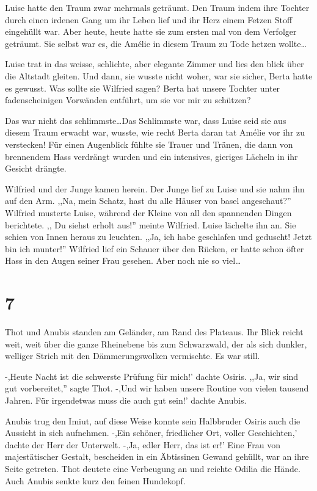 \documentclass[11pt,titlepage,a5paper]{book}
\newcommand{\am}{Amélie }
\begin{document}
Luise hatte den Traum zwar mehrmals geträumt. Den Traum indem ihre Tochter durch einen irdenen Gang um ihr Leben lief und ihr Herz einem Fetzen Stoff eingehüllt war. Aber heute, heute hatte sie zum ersten mal von dem Verfolger geträumt. Sie selbst war es, die \am in diesem Traum zu Tode hetzen wollte\dots

Luise trat in das weisse, schlichte, aber elegante Zimmer und lies den blick über die Altstadt gleiten. Und dann, sie wusste nicht woher, war sie sicher, Berta hatte es gewusst. Was sollte sie Wilfried sagen? Berta hat unsere Tochter unter fadenscheinigen Vorwänden entführt, um sie vor mir zu schützen?

Das war nicht das schlimmste\dots Das Schlimmste war, dass Luise seid sie aus diesem Traum erwacht war, wusste, wie recht Berta daran tat \am vor ihr zu verstecken! Für einen Augenblick fühlte sie Trauer und Tränen, die dann von brennendem Hass verdrängt wurden und ein intensives, gieriges Lächeln in ihr Gesicht drängte.

Wilfried und der Junge kamen herein. Der Junge lief zu Luise und sie nahm ihn auf den Arm. ,,Na, mein Schatz, hast du alle Häuser von basel angeschaut?'' Wilfried musterte Luise, während der Kleine von all den spannenden Dingen berichtete. ,, Du siehst erholt aus!'' meinte Wilfried. Luise lächelte ihn an. Sie schien von Innen heraus zu leuchten. ,,Ja, ich habe geschlafen und geduscht! Jetzt bin ich munter!'' Wilfried lief ein Schauer über den Rücken, er hatte schon öfter Hass in den Augen seiner Frau gesehen. Aber noch nie so viel\dots

\section*{7}

Thot und Anubis standen am Geländer, am Rand des Plateaus. Ihr Blick reicht weit, weit über die ganze Rheinebene bis zum Schwarzwald, der als sich dunkler, welliger Strich mit den Dämmerungswolken vermischte. Es war still. 

-,Heute Nacht ist die schwerste Prüfung für mich!' dachte Osiris. ,,Ja, wir sind gut vorbereitet,'' sagte Thot. -,Und wir haben unsere Routine von vielen tausend Jahren. Für irgendetwas muss die auch gut sein!' dachte Anubis.

Anubis trug den Imiut, auf diese Weise konnte sein Halbbruder Osiris auch die Aussicht in sich aufnehmen. -,Ein schöner, friedlicher Ort, voller Geschichten,' dachte der Herr der Unterwelt. -,Ja, edler Herr, das ist er!' Eine Frau von majestätischer Gestalt, bescheiden in ein Äbtissinen Gewand gehüllt, war an ihre Seite getreten. Thot deutete eine Verbeugung an und reichte Odilia die Hände. Auch Anubis senkte kurz den feinen Hundekopf. 
\end{document}
